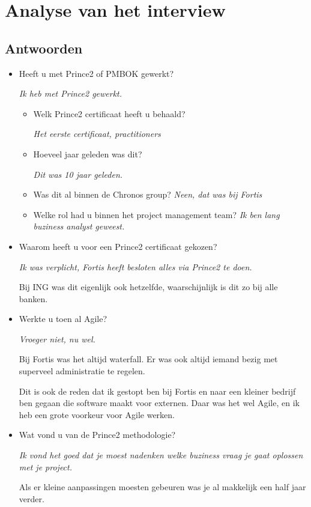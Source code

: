 \documentclass[]{article}
\begin{document}
\section{Analyse van het interview}

\subsection{Antwoorden}
\begin{itemize}
	\item Heeft u met Prince2 of PMBOK gewerkt?
	
		{\it Ik heb met Prince2 gewerkt.}
	\begin{itemize}
		\item Welk Prince2 certificaat heeft u behaald?
		
		{\it Het eerste certificaat, practitioners}
		
		\item Hoeveel jaar geleden was dit?
		
		{\it 
			Dit was 10 jaar geleden.
		}
		\item Was dit al binnen de Chronos group?
		{\it 
			Neen, dat was bij Fortis
		}
		\item Welke rol had u binnen het project management team?
		{\it 
			Ik ben lang buziness analyst geweest.
		}
	\end{itemize}
	\item Waarom heeft u voor een Prince2 certificaat gekozen?
	{\it 
		Ik was verplicht, Fortis heeft besloten alles via Prince2 te doen.
		
		Bij ING was dit eigenlijk ook hetzelfde, waarschijnlijk is dit zo bij alle banken.
	}
	\item Werkte u toen al Agile?
	
	{\it 
		Vroeger niet, nu wel.
		
		Bij Fortis was het altijd waterfall. Er was ook altijd iemand bezig met superveel administratie te regelen.
		
		Dit is ook de reden dat ik gestopt ben bij Fortis en naar een kleiner bedrijf ben gegaan die software maakt voor externen. Daar was het wel Agile, en ik heb een grote voorkeur voor Agile werken.
	}
	\item Wat vond u van de Prince2 methodologie?
	{\it 
		Ik vond het goed dat je moest nadenken welke buziness vraag je gaat oplossen met je project.
		
		Als er kleine aanpassingen moesten gebeuren was je al makkelijk een half jaar verder.
		
}
\end{itemize}
\end{document}
